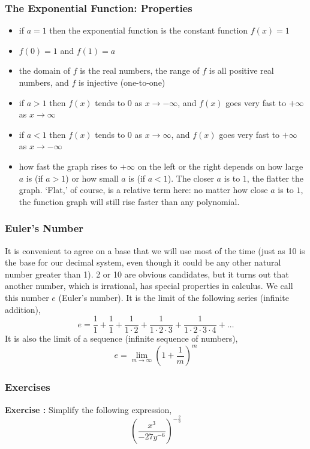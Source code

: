 \documentclass[xcolor=dvipsnames]{beamer}
\newcounter{exercise}
\newcommand{\ubung}[0]{\refstepcounter{exercise}\textbf{Exercise \arabic{exercise}: }}
\begin{document}
\begin{frame}
  \frametitle{The Exponential Function: Properties}
\begin{itemize}
\item<1-> if $a=1$ then the exponential function is the constant function $f(x)=1$
\item<2-> $f(0)=1$ and $f(1)=a$
\item<3-> the domain of $f$ is the real numbers, the range of $f$ is
  all positive real numbers, and $f$ is injective (one-to-one)
\item<4-> if $a>1$ then $f(x)$ tends to $0$ as $x\rightarrow -\infty$, and
  $f(x)$ goes very fast to $+\infty$ as $x\rightarrow \infty$
\item<5-> if $a<1$ then $f(x)$ tends to $0$ as $x\rightarrow \infty$, and
  $f(x)$ goes very fast to $+\infty$ as $x\rightarrow -\infty$
\item<6-> how fast the graph rises to $+\infty$ on the left or the
  right depends on how large $a$ is (if $a>1$) or how small
  $a$ is (if $a<1$). The closer $a$ is to $1$, the flatter the graph.
  `Flat,' of course, is a relative term here: no matter how close $a$
  is to $1$, the function graph will still rise faster than any polynomial.
\end{itemize}
\end{frame}

\begin{frame}
  \frametitle{Euler's Number}
It is convenient to agree on a base that we will use most of the time
(just as 10 is the base for our decimal system, even though it could
be any other natural number greater than 1). 2 or 10 are obvious
candidates, but it turns out that another number, which is irrational,
has special properties in calculus. We call this number $e$ (Euler's
number). It is the limit of the following series (infinite addition),
\begin{equation}
  \label{eq:ohxairei}
    e=\frac{1}{1}+\frac{1}{1}+\frac{1}{1\cdot 2}+\frac{1}{1\cdot 2\cdot
    3}+\frac{1}{1\cdot 2\cdot 3\cdot 4}+\ldots
\end{equation}
It is also the limit of a sequence (infinite sequence of numbers),
\begin{equation}
  \label{eq:eyalachi}
  e=\lim_{m\rightarrow\infty}\left(1+\frac{1}{m}\right)^{m}
\end{equation}
\end{frame}

\begin{frame}
  \frametitle{Exercises}
  {\ubung} Simplify the following expression,
\begin{equation}
  \label{eq:eedeezoh}
  \left(\frac{x^{3}}{-27y^{-6}}\right)^{-\frac{2}{3}}
\end{equation}
\end{frame}
\end{document}
